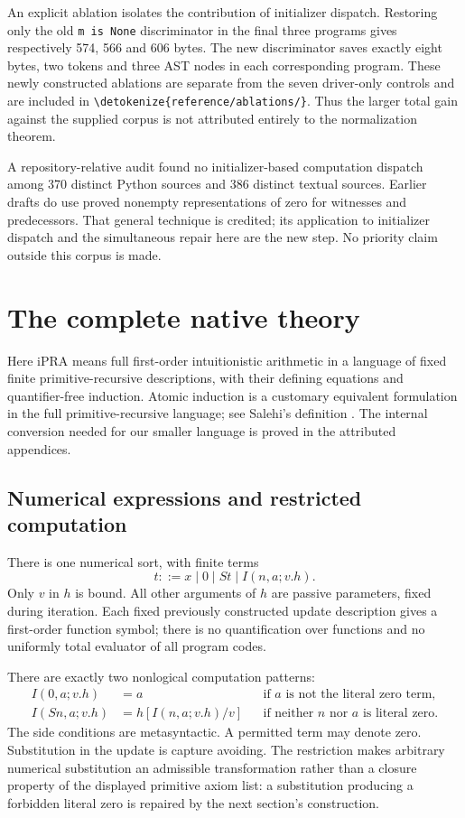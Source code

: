 \documentclass[11pt,letterpaper]{article}
\theoremstyle{definition}\newtheorem{definition}[theorem]{Definition}
\theoremstyle{remark}\newtheorem{remark}[theorem]{Remark}
\newcommand{\file}[1]{\expandafter\nolinkurl\expandafter{\detokenize{#1}}}
\begin{document}
An explicit ablation isolates the contribution of initializer dispatch.
Restoring only the old \texttt{m is None} discriminator in the final
three programs gives respectively 574, 566 and 606 bytes. The new
discriminator saves exactly eight bytes, two tokens and three AST nodes
in each corresponding program. These newly constructed ablations are
separate from the seven driver-only controls and are included in
\file{reference/ablations/}. Thus the larger total gain against the
supplied corpus is not attributed entirely to the normalization theorem.

A repository-relative audit found no initializer-based computation
dispatch among 370 distinct Python sources and 386 distinct textual
sources. Earlier drafts do use proved nonempty representations of zero
for witnesses and predecessors. That general technique is credited;
its application to initializer dispatch and the simultaneous repair here
are the new step. No priority claim outside this corpus is made.

\section{The complete native theory}
\label{sec:inventory}

Here iPRA means full first-order intuitionistic arithmetic in a language
of fixed finite primitive-recursive descriptions, with their defining
equations and quantifier-free induction. Atomic induction is a customary
equivalent formulation in the full primitive-recursive language; see
Salehi's definition \cite{salehi}. The internal conversion needed for our
smaller language is proved in the attributed appendices.

\subsection{Numerical expressions and restricted computation}

There is one numerical sort, with finite terms
\[
             t ::= x\mid 0\mid St\mid I(n,a;v.h).
\]
Only $v$ in $h$ is bound. All other arguments of $h$ are passive
parameters, fixed during iteration. Each fixed previously constructed
update description gives a first-order function symbol; there is no
quantification over functions and no uniformly total evaluator of all
program codes.

There are exactly two nonlogical computation patterns:
\begin{align}
 I(0,a;v.h)&=a &&\text{if $a$ is not the literal zero term},\tag{R0}\label{eq:r0}\\
 I(Sn,a;v.h)&=h[I(n,a;v.h)/v]
 &&\text{if neither $n$ nor $a$ is literal zero}.\tag{RS}\label{eq:rs}
\end{align}
The side conditions are metasyntactic. A permitted term may denote zero.
Substitution in the update is capture avoiding. The restriction makes
arbitrary numerical substitution an admissible transformation rather
than a closure property of the displayed primitive axiom list: a
substitution producing a forbidden literal zero is repaired by the
next section's construction.
\end{document}
